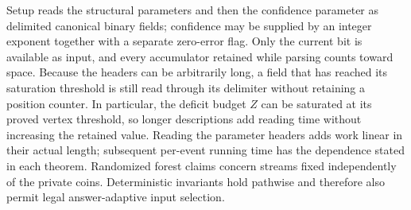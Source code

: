 \documentclass[11pt,letterpaper]{article}
\numberwithin{equation}{section}
\begin{document}
Setup reads the structural parameters and then the confidence parameter as delimited canonical binary fields; confidence may be supplied by an integer exponent together with a separate zero-error flag.
Only the current bit is available as input, and every accumulator retained while parsing counts toward space.
Because the headers can be arbitrarily long, a field that has reached its saturation threshold is still read through its delimiter without retaining a position counter.
In particular, the deficit budget $Z$ can be saturated at its proved vertex threshold, so longer descriptions add reading time without increasing the retained value.
Reading the parameter headers adds work linear in their actual length; subsequent per-event running time has the dependence stated in each theorem.
Randomized forest claims concern streams fixed independently of the private coins.
Deterministic invariants hold pathwise and therefore also permit legal answer-adaptive input selection.
\end{document}
